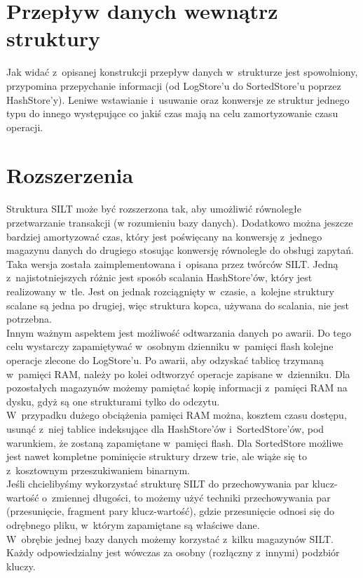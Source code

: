 \documentclass[declaration,shortabstract,masc]{iithesis}
\begin{document}
		\section{Przepływ danych wewnątrz struktury}
			Jak widać z~opisanej konstrukcji przepływ danych w~strukturze jest spowolniony, przypomina przepychanie informacji (od LogStore'u do SortedStore'u poprzez HashStore'y). Leniwe wstawianie i~usuwanie oraz konwersje ze struktur jednego typu do innego występujące co jakiś czas mają na celu zamortyzowanie czasu operacji.
		\section{Rozszerzenia}
			Struktura SILT może być rozszerzona tak, aby umożliwić równoległe przetwarzanie transakcji (w rozumieniu bazy danych). Dodatkowo można jeszcze bardziej amortyzować czas, który jest poświęcany na konwersję z~jednego magazynu danych do drugiego stosując konwersję równolegle do obsługi zapytań. Taka wersja została zaimplementowana i~opisana przez twórców SILT. Jedną z~najistotniejszych różnic jest sposób scalania HashStore'ów, który jest realizowany w~tle. Jest on jednak rozciągnięty w~czasie, a~kolejne struktury scalane są jedna po drugiej, więc struktura kopca, używana do scalania, nie jest potrzebna.\\
			\indent Innym ważnym aspektem jest możliwość odtwarzania danych po awarii. Do tego celu wystarczy zapamiętywać w~osobnym dzienniku w~pamięci flash kolejne operacje zlecone do LogStore'u. Po awarii, aby odzyskać tablicę trzymaną w~pamięci RAM, należy po kolei odtworzyć operacje zapisane w~dzienniku. Dla pozostałych magazynów możemy pamiętać kopię informacji z~pamięci RAM na dysku, gdyż są one strukturami tylko do odczytu.\\
			\indent W~przypadku dużego obciążenia pamięci RAM można, kosztem czasu dostępu, usunąć z~niej tablice indeksujące dla HashStore'ów i~SortedStore'ów, pod warunkiem, że zostaną zapamiętane w~pamięci flash. Dla SortedStore możliwe jest nawet kompletne pominięcie struktury drzew trie, ale wiąże się to z~kosztownym przeszukiwaniem binarnym.\\
			\indent Jeśli chcielibyśmy wykorzystać strukturę SILT do przechowywania par klucz-wartość o~zmiennej długości, to możemy użyć techniki przechowywania par (przesunięcie, fragment pary klucz-wartość), gdzie przesunięcie odnosi się do odrębnego pliku, w~którym zapamiętane są właściwe dane.\\
			\indent W~obrębie jednej bazy danych możemy korzystać z~kilku magazynów SILT. Każdy odpowiedzialny jest wówczas za osobny (rozłączny z~innymi) podzbiór kluczy.
\end{document}

